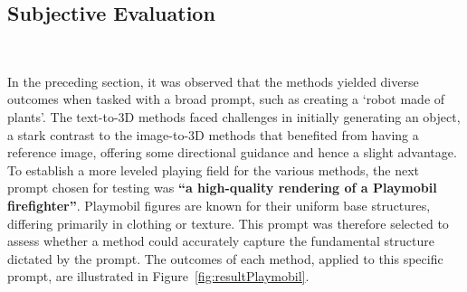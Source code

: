 \subsection{Subjective Evaluation}~\label{subjective}

In the preceding section, it was observed that the methods yielded diverse outcomes when tasked with a broad prompt, such as creating a `robot made of plants'. The text-to-3D methods faced challenges in initially generating an object, a stark contrast to the image-to-3D methods that benefited from having a reference image, offering some directional guidance and hence a slight advantage. To establish a more leveled playing field for the various methods, the next prompt chosen for testing was \textbf{``a high-quality rendering of a Playmobil firefighter''}. Playmobil figures are known for their uniform base structures, differing primarily in clothing or texture. This prompt was therefore selected to assess whether a method could accurately capture the fundamental structure dictated by the prompt. The outcomes of each method, applied to this specific prompt, are illustrated in Figure~\ref{fig:resultPlaymobil}. 

